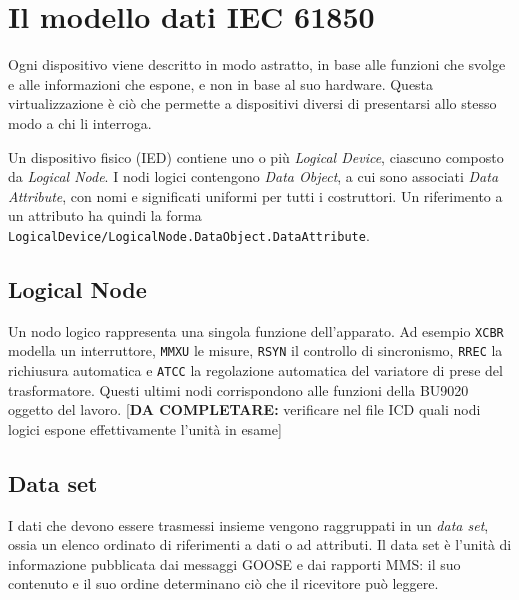 \documentclass[11pt,a4paper,italian,oneside,openany]{book}
\newcommand{\daf}[1]{{\color{red}[\textbf{DA COMPLETARE:} #1]}}
\begin{document}
\section{Il modello dati IEC 61850}
Ogni dispositivo viene descritto in modo astratto, in base alle funzioni che svolge e alle informazioni che espone, e non in base al suo hardware. Questa virtualizzazione è ciò che permette a dispositivi diversi di presentarsi allo stesso modo a chi li interroga.

Un dispositivo fisico (IED) contiene uno o più \textit{Logical Device}, ciascuno composto da \textit{Logical Node}. I nodi logici contengono \textit{Data Object}, a cui sono associati \textit{Data Attribute}, con nomi e significati uniformi per tutti i costruttori. Un riferimento a un attributo ha quindi la forma \texttt{LogicalDevice/LogicalNode.DataObject.DataAttribute}.

\subsection{Logical Node}
Un nodo logico rappresenta una singola funzione dell'apparato. Ad esempio \texttt{XCBR} modella un interruttore, \texttt{MMXU} le misure, \texttt{RSYN} il controllo di sincronismo, \texttt{RREC} la richiusura automatica e \texttt{ATCC} la regolazione automatica del variatore di prese del trasformatore. Questi ultimi nodi corrispondono alle funzioni della BU9020 oggetto del lavoro. \daf{verificare nel file ICD quali nodi logici espone effettivamente l'unità in esame}

\subsection{Data set}
I dati che devono essere trasmessi insieme vengono raggruppati in un \textit{data set}, ossia un elenco ordinato di riferimenti a dati o ad attributi. Il data set è l'unità di informazione pubblicata dai messaggi GOOSE e dai rapporti MMS: il suo contenuto e il suo ordine determinano ciò che il ricevitore può leggere.

\end{document}
